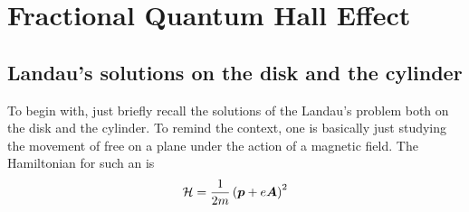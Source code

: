 \chapter{Fractional Quantum Hall Effect}

	\section{Landau's solutions on the disk and the cylinder}
	
		To begin with, just briefly recall the solutions of the Landau's problem both on the disk and the cylinder. To remind the context, one is basically just studying the movement of free \electron on a plane under the action of a magnetic field. The Hamiltonian for such an \electron is
		\begin{equation}
		    \mathcal{H}=\frac{1}{2m}\left(\vb*{p}+e\vb*{A}\right)^2
		\end{equation}

